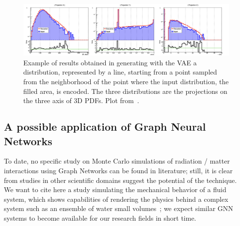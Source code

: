 
\begin{figure}[!bht]
\centering
\includegraphics [width=\textwidth]{images/generated}
\caption{Example of results obtained in generating with the VAE a distribution, represented by a line, starting from a point sampled from the neighborhood of the point where the input distribution, the filled area, is encoded. The three distributions are the projections on the three axis of 3D PDFs. Plot from~\cite{Ciardiello2020}.}
\label{fig:out}
\end{figure}



\subsection{A possible application of Graph Neural Networks}
To date, no specific study on Monte Carlo simulations of radiation / matter interactions using Graph Networks can be found in literature; still, it is clear from studies in other scientific domains suggest the potential of the technique. 
We want to cite here a study simulating the mechanical behavior of a fluid system, which shows capabilities of rendering the physics behind a complex system such as an ensemble of water small volumes~\cite{Sanchez-Gonzalez2020}; we expect similar GNN systems to become available for our research fields in short time.
